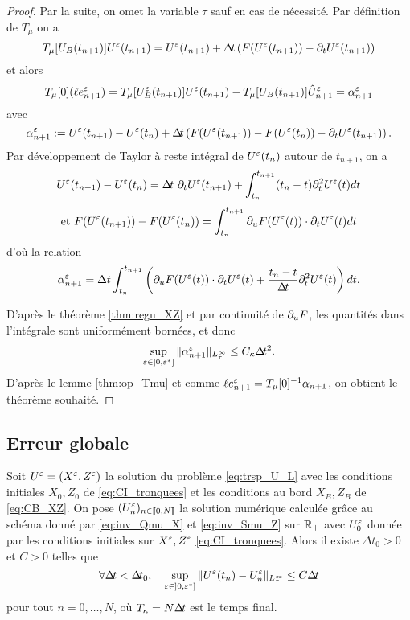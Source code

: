 \begin{proof}
Par la suite, on omet la variable $\tau$ sauf en cas de nécessité. Par définition de $T_{\mu}$ on a 
$$ T_{\mu}[U_B(t_{n+1})]U^{\varepsilon}(t_{n+1}) = U^{\varepsilon}(t_{n+1}) + \Delta\!\!\!\ t \left( F(U^{\varepsilon}(t_{n+1})) - \partial_t U^{\varepsilon}(t_{n+1})\right) $$
et alors
$$ T_{\mu}[0](\ell e_{n+1}^{\varepsilon}) = T_{\mu}[U_B^{\varepsilon}(t_{n+1})]U^{\varepsilon}(t_{n+1}) - T_{\mu}[U_B(t_{n+1})]\hat{U}_{n+1}^{\varepsilon} = \alpha_{n+1}^{\varepsilon} $$
avec 
$$ \alpha_{n+1}^{\varepsilon} := U^{\varepsilon}(t_{n+1}) - U^{\varepsilon}(t_n) + \Delta\!\!\!\ t \left( F(U^{\varepsilon}(t_{n+1})) - F(U^{\varepsilon}(t_n)) - \partial_t U^{\varepsilon}(t_{n+1})\right). $$
Par développement de Taylor à reste intégral de $U^{\varepsilon}(t_n)$ autour de $t_{n+1}$, on a 
$$ U\eeps(t_{n+1}) - U\eeps(t_n) = \dt\ \dpt U\eeps(t_{n+1}) + \int_{t_n}^{t_{n+1}} (t_n - t)\dpt^2 U\eeps(t) dt $$
$$\text{et } F(U^{\varepsilon}(t_{n+1})) - F(U^{\varepsilon}(t_n)) = \int_{t_n}^{t_{n+1}} \partial_{u} F(U^{\varepsilon}(t))\cdot \partial_t U^{\varepsilon}(t)dt $$
d'où la relation
$$ \alpha_{n+1}^{\varepsilon} = \Delta t\int_{t_n}^{t_{n+1}} \left( \partial_{u} F(U^{\varepsilon}(t))\cdot \partial_t U^{\varepsilon}(t) + \frac{t_n-t}{\Delta\!\!\!\ t}\partial_t^2 U^{\varepsilon}(t) \right) dt. $$

D'après le théorème \ref{thm:regu_XZ} et par continuité de $\partial_{u} F$, les quantités dans l'intégrale sont uniformément bornées, et donc 
$$ \sup_{\varepsilon\in ]0,\varepsilon^*]} \|\alpha_{n+1}^{\varepsilon}\|_{L^{\infty}_{\tau}} \leq C_{\kappa}\Delta\!\!\!\ t^2. $$
D'après le lemme \ref{thm:op_Tmu} et comme $\ell e_{n+1}^{\varepsilon} = T_{\mu}[0]^{-1}\alpha_{n+1}$, on obtient le théorème souhaité. 
\end{proof}

\subsection{Erreur globale}

\begin{theorem} \label{thm:err_glob}
Soit $U^{\varepsilon} = (X^{\varepsilon},Z^{\varepsilon})$ la solution du problème \eqref{eq:trsp_U_L} avec les conditions initiales $X_0,Z_0$ de \eqref{eq:CI_tronquees} et les conditions au bord $X_B,Z_B$ de \eqref{eq:CB_XZ}. 
On pose $(U_n^{\varepsilon})_{n\in[\![0,N]\!]}$ la solution numérique calculée grâce au schéma donné par \eqref{eq:inv_Qmu_X} et \eqref{eq:inv_Smu_Z} sur $\mathbb{R}_+$ avec $U_0^{\varepsilon}$ donnée par les conditions initiales sur $X^{\varepsilon},Z^{\varepsilon}$ \eqref{eq:CI_tronquees}. 
Alors il existe $\Delta t_0 > 0$ et $C > 0$ telles que 
$$\forall \dt < \dt_0, \quad 
\sup_{\epsilon\in]0,\epsilon^*]} \|U\eeps(t_n) - U\eeps_n\|_{\Linftau} \leq C\dt $$
pour tout $n = 0,\ldots,N$, où $T_{\kappa} = N\Delta\!\!\!\ t$ est le temps final. 
\end{theorem}

